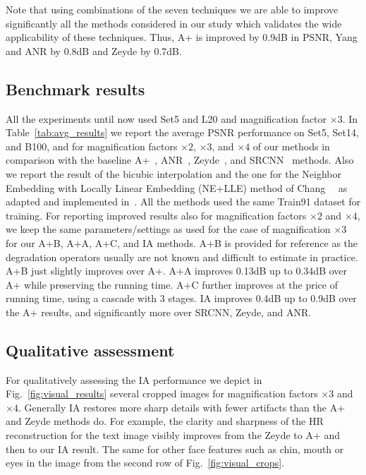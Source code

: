 \documentclass[10pt,twocolumn,letterpaper]{article}
\begin{document}
Note that using combinations of the seven techniques we are able to improve significantly all the methods considered in our study which validates the wide applicability of these techniques. Thus, A+ is improved by 0.9dB in PSNR, Yang and ANR by 0.8dB and Zeyde by 0.7dB.

\subsection{Benchmark results}
\label{ssc:benchmarks}
All the experiments until now used Set5 and L20 and magnification factor $\times3$.
In Table~\ref{tab:avg_results} we report the average PSNR performance on Set5, Set14, and B100, and for magnification factors $\times2$, $\times3$, and $\times4$ of our methods in comparison with the baseline A+~\cite{Timofte-ACCV-2014}, ANR~\cite{Timofte-ICCV-2013}, Zeyde~\cite{Zeyde-CS-2012}, and SRCNN~\cite{Dong-ECCV-2014} methods. Also we report the result of the bicubic interpolation and the one for the Neighbor Embedding with Locally Linear Embedding (NE+LLE) method of Chang~\etal~\cite{Chang-CVPR-2004} as adapted and implemented in~\cite{Timofte-ICCV-2013}. All the methods used the same Train91 dataset for training.
For reporting improved results also for magnification factors $\times2$ and $\times4$, we keep the same parameters/settings as used for the case of magnification $\times3$ for our A+B, A+A, A+C, and IA methods.
A+B is provided for reference as the degradation operators usually are not known and difficult to estimate in practice. A+B just slightly improves over A+.
A+A improves 0.13dB up to 0.34dB over A+ while preserving the running time. A+C further improves at the price of running time, using a cascade with 3 stages.
IA improves 0.4dB up to 0.9dB over the A+ results, and significantly more over SRCNN, Zeyde, and ANR. 

\subsection{Qualitative assessment}
For qualitatively assessing the IA performance we depict in Fig.~\ref{fig:visual_results} several cropped images for magnification factors $\times3$ and $\times4$. Generally IA restores more sharp details with fewer artifacts than the A+ and Zeyde methods do. For example, the clarity and sharpness of the HR reconstruction for the text image visibly improves from the Zeyde to A+ and then to our IA result.
The same for other face features such as chin, mouth or eyes in the image from the second row of Fig.~\ref{fig:visual_crops}.
\end{document}
